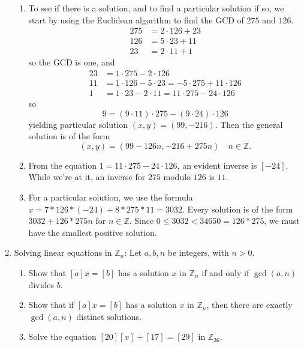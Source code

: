 \documentclass{amsart}
\def\Z{\mathbb Z}
\begin{document}
\begin{enumerate}
\begin{framed}
\begin{enumerate}
\item To see if there is a solution, and to find a particular solution if so, we start by using the Euclidean algorithm to find the GCD of $275$ and $126$.
\[\begin{aligned} 
 275 &= 2 \cdot 126 + 23 \\
 126 &= 5 \cdot 23 + 11 \\
 23 &= 2 \cdot 11 + 1
\end{aligned} \]
so the GCD is one, and
\[\begin{aligned} 
 23 &= 1\cdot 275 -  2 \cdot 126 \\
 11 &= 1 \cdot 126 - 5 \cdot 23 = -5 \cdot 275 + 11 \cdot 126 \\
1 &=  1 \cdot 23 - 2 \cdot 11 = 11 \cdot 275 - 24 \cdot 126
\end{aligned} \]
so 
\[ 9 = (9\cdot 11) \cdot 275 - (9\cdot 24) \cdot 126\]
yielding particular solution $(x,y) = (99,-216)$.
Then the general solution is of the form
\[ (x,y) = (99-126n,-216+275n) \quad n\in \Z.\]
\item From the equation $1  = 11 \cdot 275 - 24 \cdot 126$, an evident inverse is $[-24]$.
While we're at it, an inverse for $275$ modulo $126$ is $11$.
\item For a particular solution, we use the formula $x = 7*126*(-24) + 8*275*11 = 3032$. Every solution is of the form $3032+ 126*275n$ for $n\in \Z$. Since $0\leq 3032< 34650=126*275$, we must have the smallest positive solution.
\end{enumerate}
\end{framed}

\item  Solving linear equations in $\Z_n$: Let $a,b,n$ be integers, with $n>0$.
\begin{enumerate}
\item Show that $[a] x = [b]$ has a solution $x$ in $\Z_n$ if and only if $\gcd(a,n)$ divides $b$.
\item Show that if $[a] x = [b]$ has a solution $x$ in $\Z_n$, then there are exactly $\gcd(a,n)$ distinct solutions.
\item Solve the equation $[20] [x] + [17] = [29]$ in $\Z_{36}$.
\end{enumerate}


\end{enumerate}
\end{document}
